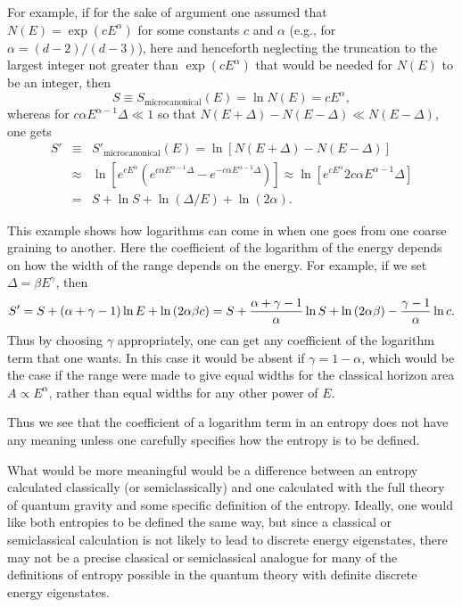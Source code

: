 \documentclass[12pt]{article} \usepackage{latexsym} \textwidth 15cm
\begin{document}
For example, if for the sake of argument one assumed that $N(E) =
\exp{(cE^\alpha)}$ for some constants $c$ and $\alpha$ (e.g., for
$\alpha = (d-2)/(d-3)$), here and henceforth neglecting the truncation
to the largest integer not greater than $\exp{(cE^\alpha)}$ that would
be needed for $N(E)$ to be an integer, then
 \begin{equation}
 S \equiv S_{\mathrm{microcanonical}}(E) = \ln{N(E)} = cE^\alpha,
 \label{eq:27}
 \end{equation}
whereas for $c\alpha E^{\alpha-1} \Delta \ll 1$ so that
$N(E+\Delta)-N(E-\Delta) \ll N(E-\Delta)$, one gets
 \begin{eqnarray}
 S' &\equiv& S'_{\mathrm{microcanonical}}(E)
    = \ln{[N(E+\Delta)-N(E-\Delta)]} \nonumber \\
    &\approx& \ln{[e^{cE^\alpha}(e^{c\alpha E^{\alpha-1}\Delta}
                               - e^{-c\alpha E^{\alpha-1}\Delta})]}
    \approx \ln{[e^{cE^\alpha} 2c\alpha E^{\alpha-1} \Delta]}
    \nonumber \\
    &=& S + \ln{S} + \ln{(\Delta/E)} + \ln{(2\alpha)}.
 \label{eq:28}
 \end{eqnarray}
 
This example shows how logarithms can come in when one goes from one
coarse graining to another.  Here the coefficient of the logarithm of
the energy depends on how the width of the range depends on the energy. 
For example, if we set $\Delta = \beta E^\gamma$, then
 \begin{equation}
 S' = S + (\alpha+\gamma-1)\ln{E} + \ln{(2\alpha\beta c)}
    = S + {\alpha+\gamma-1 \over \alpha} \ln{S} + \ln{(2\alpha\beta)}
        - {\gamma-1\over\alpha} \ln{c}.
 \label{eq:29}
 \end{equation}
Thus by choosing $\gamma$ appropriately, one can get any coefficient of
the logarithm term that one wants.  In this case it would be absent if
$\gamma = 1-\alpha$, which would be the case if the range were made to
give equal widths for the classical horizon area $A \propto E^\alpha$,
rather than equal widths for any other power of $E$.

Thus we see that the coefficient of a logarithm term in an entropy does
not have any meaning unless one carefully specifies how the entropy is
to be defined.

What would be more meaningful would be a difference between an entropy
calculated classically (or semiclassically) and one calculated with the
full theory of quantum gravity and some specific definition of the
entropy.  Ideally, one would like both entropies to be defined the same
way, but since a classical or semiclassical calculation is not likely
to lead to discrete energy eigenstates, there may not be a precise
classical or semiclassical analogue for many of the definitions of
entropy possible in the quantum theory with definite discrete energy
eigenstates.
\end{document}
